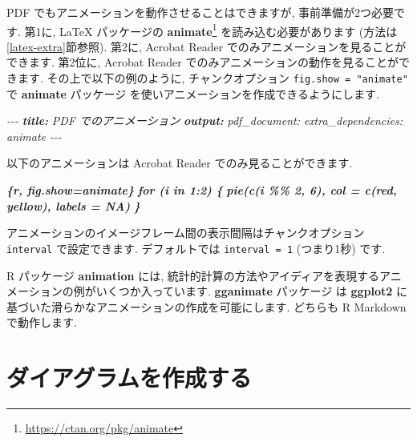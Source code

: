 \documentclass[
  11pt,
  lualatex,
  ja=standard]{bxjsreport}
\newenvironment{Shaded}{\begin{snugshade}}{\end{snugshade}}
\newcommand{\AnnotationTok}[1]{\textcolor[rgb]{0.56,0.35,0.01}{\textbf{\textit{#1}}}}
\newcommand{\CommentTok}[1]{\textcolor[rgb]{0.56,0.35,0.01}{\textit{#1}}}
\newcommand{\InformationTok}[1]{\textcolor[rgb]{0.56,0.35,0.01}{\textbf{\textit{#1}}}}
\newcommand{\NormalTok}[1]{#1}
\renewcommand{\href}[2]{#2\footnote{\url{#1}}}
\begin{document}
PDF でもアニメーションを動作させることはできますが, 事前準備が2つ必要です. 第1に, LaTeX パッケージの \href{https://ctan.org/pkg/animate}{\textbf{animate}} を読み込む必要があります (方法は\ref{latex-extra}節参照). 第2に, Acrobat Reader でのみアニメーションを見ることができます. 第2位に, Acrobat Reader でのみアニメーションの動作を見ることができます. その上で以下の例のように, チャンクオプション \texttt{fig.show = "animate"} で \textbf{animate} パッケージ を使いアニメーションを作成できるようにします.

\begin{Shaded}
\begin{Highlighting}[]
\CommentTok{{-}{-}{-}}
\AnnotationTok{title:}\CommentTok{ PDF でのアニメーション}
\AnnotationTok{output:}
\CommentTok{  pdf\_document:}
\CommentTok{    extra\_dependencies: animate}
\CommentTok{{-}{-}{-}}

\NormalTok{以下のアニメーションは Acrobat Reader でのみ見ることができます.}

\InformationTok{\textasciigrave{}\textasciigrave{}\textasciigrave{}\{r, fig.show=\textquotesingle{}animate\textquotesingle{}\}}
\InformationTok{for (i in 1:2) \{}
\InformationTok{  pie(c(i \%\% 2, 6), col = c(\textquotesingle{}red\textquotesingle{}, \textquotesingle{}yellow\textquotesingle{}), labels = NA)}
\InformationTok{\}}
\InformationTok{\textasciigrave{}\textasciigrave{}\textasciigrave{}}
\end{Highlighting}
\end{Shaded}

アニメーションのイメージフレーム間の表示間隔はチャンクオプション \texttt{interval} で設定できます. デフォルトでは \texttt{interval = 1} (つまり1秒) です.

R パッケージ \textbf{animation} \autocite{R-animation} には, 統計的計算の方法やアイディアを表現するアニメーションの例がいくつか入っています. \textbf{gganimate} パッケージ \autocite{R-gganimate} は \textbf{ggplot2} \autocite{R-ggplot2} に基づいた滑らかなアニメーションの作成を可能にします. どちらも R Markdown で動作します.

\hypertarget{diagrams}{%
\section{ダイアグラムを作成する}\label{diagrams}}
\end{document}
